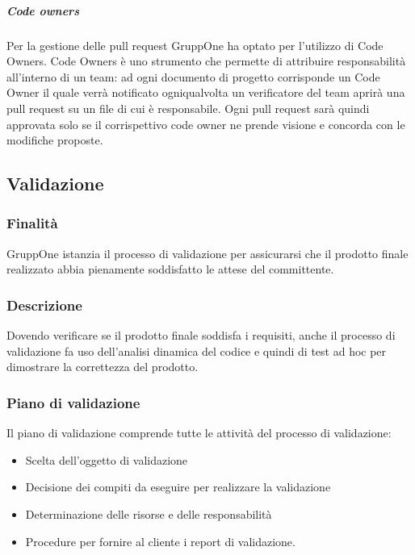 \documentclass[../norme-di-progetto.tex]{subfiles}
\begin{document}
\subparagraph{Code owners}%
\label{subp:code_owners}

Per la gestione delle pull request GruppOne ha optato per l'utilizzo di Code Owners. Code Owners è uno strumento che permette di attribuire responsabilità all'interno di un team: ad ogni documento di progetto corrisponde un Code Owner il quale verrà notificato ogniqualvolta un verificatore del team aprirà una pull request su un file di cui è responsabile. Ogni pull request sarà quindi approvata solo se il corrispettivo code owner ne prende visione e concorda con le modifiche proposte.

\subsection{Validazione}%
\label{sub:validazione}

\subsubsection{Finalità}%
\label{subs:validazione/finalita}

GruppOne istanzia il processo di validazione per assicurarsi che il prodotto finale realizzato abbia pienamente soddisfatto le attese del committente.

\subsubsection{Descrizione}%
\label{subs:validazione/descrizione}

Dovendo verificare se il prodotto finale soddisfa i requisiti, anche il processo di validazione fa uso dell'analisi dinamica del codice e quindi di test ad hoc per dimostrare la correttezza del prodotto.

\subsubsection{Piano di validazione}%
\label{subs:piano_di_validazione}

Il piano di validazione comprende tutte le attività del processo di validazione:

\begin{itemize}
  \item Scelta dell'oggetto di validazione
  \item Decisione dei compiti da eseguire per realizzare la validazione
  \item Determinazione delle risorse e delle responsabilità
  \item Procedure per fornire al cliente i report di validazione.
\end{itemize}
\end{document}
